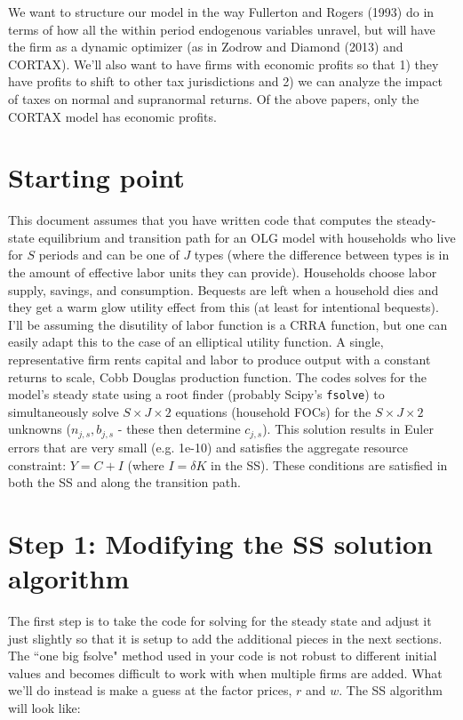 \documentclass[letterpaper,12pt]{article}
\theoremstyle{definition}
\begin{document}
\begin{spacing}{1.5}
We want to structure our model in the way Fullerton and Rogers (1993) do in terms of how all the within period endogenous variables unravel, but will have the firm as a dynamic optimizer (as in Zodrow and Diamond (2013) and CORTAX).  We'll also want to have firms with economic profits so that 1) they have profits to shift to other tax jurisdictions and 2) we can analyze the impact of taxes on normal and supranormal returns.  Of the above papers, only the CORTAX model has economic profits.  

\section*{Starting point}

This document assumes that you have written code that computes the steady-state equilibrium and transition path for an OLG model with households who live for $S$ periods and can be one of $J$ types (where the difference between types is in the amount of effective labor units they can provide).  Households choose labor supply, savings, and consumption.  Bequests are left when a household dies and they get a warm glow utility effect from this (at least for intentional bequests).  I'll be assuming the disutility of labor function is a CRRA function, but one can easily adapt this to the case of an elliptical utility function.  A single, representative firm rents capital and labor to produce output with a constant returns to scale, Cobb Douglas production function.  The codes solves for the model's steady state using a root finder (probably Scipy's \texttt{fsolve}) to simultaneously solve $S\times J \times 2$ equations (household FOCs) for the $S\times J \times 2$ unknowns ($n_{j,s}, b_{j,s}$ - these then determine $c_{j,s}$).  This solution results in Euler errors that are very small (e.g. 1e-10) and satisfies the aggregate resource constraint: $Y=C+I$ (where $I=\delta K$ in the SS).  These conditions are satisfied in both the SS and along the transition path.

\section*{Step 1: Modifying the SS solution algorithm}

The first step is to take the code for solving for the steady state and adjust it just slightly so that it is setup to add the additional pieces in the next sections.  The ``one big fsolve" method used in your code is not robust to different initial values and becomes difficult to work with when multiple firms are added.  What we'll do instead is make a guess at the factor prices, $r$ and $w$.  The SS algorithm will look like:


\end{spacing}
\end{document}
